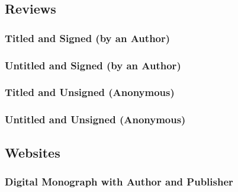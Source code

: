 \documentclass{ltxdockit}
\begin{document}
\subsection{Reviews} %
\label{sec:reviews}
\subsubsection{Titled and Signed (by an Author)} %
\label{sub:titled_and_signed_by_an_author}
\begin{refsection}
	\printbibliography[heading=none]
\end{refsection}
\subsubsection{Untitled and Signed (by an Author)} %
\label{sub:untitled_and_signed_by_an_author}
\begin{refsection}
	\printbibliography[heading=none]
\end{refsection}
\subsubsection{Titled and Unsigned (Anonymous)} %
\label{sub:titled_and_unsigned_anonymous}
\begin{refsection}
	\printbibliography[heading=none]
\end{refsection}
\subsubsection{Untitled and Unsigned (Anonymous)} %
\label{sub:untitled_and_unsigned_anonymous}
\begin{refsection}
	\printbibliography[heading=none]
\end{refsection}

\subsection{Websites} %
\label{sec:websites}
\subsubsection{Digital Monograph with Author and Publisher} %
\label{sub:digital_monograph_with_author_and_publisher}
\begin{refsection}
	\printbibliography[heading=none]
\end{refsection}
\end{document}
